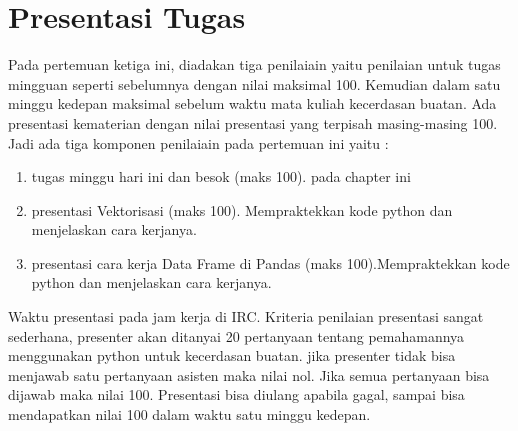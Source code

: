 \section{Presentasi Tugas}
Pada pertemuan ketiga ini, diadakan tiga penilaiain yaitu penilaian untuk tugas mingguan seperti sebelumnya dengan nilai maksimal 100. Kemudian dalam satu minggu kedepan maksimal sebelum waktu mata kuliah kecerdasan buatan. Ada presentasi kematerian dengan nilai presentasi yang terpisah masing-masing 100. Jadi ada tiga komponen penilaiain pada pertemuan ini yaitu :
\begin{enumerate}
	\item tugas minggu hari ini dan besok (maks 100). pada chapter ini
	\item presentasi Vektorisasi (maks 100). Mempraktekkan kode python dan menjelaskan cara kerjanya.
	\item presentasi cara kerja Data Frame di Pandas (maks 100).Mempraktekkan kode python dan menjelaskan cara kerjanya.
\end{enumerate}
Waktu presentasi pada jam kerja di IRC. Kriteria penilaian presentasi sangat sederhana, presenter akan ditanyai 20 pertanyaan tentang pemahamannya menggunakan python untuk kecerdasan buatan. jika presenter tidak bisa menjawab satu pertanyaan asisten maka nilai nol. Jika semua pertanyaan bisa dijawab maka nilai 100. Presentasi bisa diulang apabila gagal, sampai bisa mendapatkan nilai 100 dalam waktu satu minggu kedepan.


